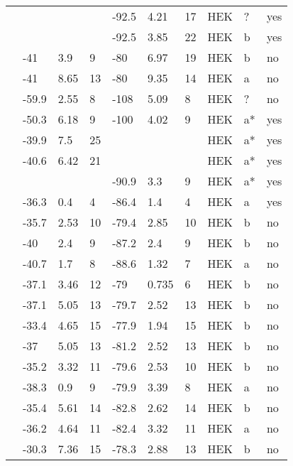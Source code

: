 \begin{footnotesize}
\begin{longtable}{p{5cm}|lll|lll|lll}
\citet{Hu2010MutationDB} & && & -92.5 & 4.21 & 17 & HEK & ? & yes \\
\citet{Hu2014MutationDB} & && & -92.5 & 3.85 & 22 & HEK & b & yes \\
\citet{Hu2015MutationDB} & -41 & 3.9 & 9 & -80 & 6.97 & 19 & HEK & b & no \\
\citet{Hu2015MutationDB} & -41 & 8.65 & 13 & -80 & 9.35 & 14 & HEK & a & no \\
\citet{Huang2006MutationDB} & -59.9 & 2.55 & 8 & -108 & 5.09 & 8 & HEK & ? & no \\
\citet{Huang2009MutationDB} & -50.3 & 6.18 & 9 & -100 & 4.02 & 9 & HEK & a* & yes \\
\citet{Itoh2005aMutationDB} & -39.9 & 7.5 & 25 & && & HEK & a* & yes \\
\citet{Itoh2005bMutationDB} & -40.6 & 6.42 & 21 & && & HEK & a* & yes \\
\citet{Itoh2007MutationDB} & && & -90.9 & 3.3 & 9 & HEK & a* & yes \\
\citet{Juang2014aMutationDB} & -36.3 & 0.4 & 4 & -86.4 & 1.4 & 4 & HEK & a & yes \\
\citet{Kapplinger2015MutationDB} & -35.7 & 2.53 & 10 & -79.4 & 2.85 & 10 & HEK & b & no \\
\citet{Kapplinger2015MutationDB} & -40 & 2.4 & 9 & -87.2 & 2.4 & 9 & HEK & b & no \\
\citet{Kapplinger2015MutationDB} & -40.7 & 1.7 & 8 & -88.6 & 1.32 & 7 & HEK & a & no \\
\citet{Kapplinger2015MutationDB} & -37.1 & 3.46 & 12 & -79 & 0.735 & 6 & HEK & b & no \\
\citet{Kapplinger2015MutationDB} & -37.1 & 5.05 & 13 & -79.7 & 2.52 & 13 & HEK & b & no \\
\citet{Kapplinger2015MutationDB} & -33.4 & 4.65 & 15 & -77.9 & 1.94 & 15 & HEK & b & no \\
\citet{Kapplinger2015MutationDB} & -37 & 5.05 & 13 & -81.2 & 2.52 & 13 & HEK & b & no \\
\citet{Kapplinger2015MutationDB} & -35.2 & 3.32 & 11 & -79.6 & 2.53 & 10 & HEK & b & no \\
\citet{Kapplinger2015MutationDB} & -38.3 & 0.9 & 9 & -79.9 & 3.39 & 8 & HEK & a & no \\
\citet{Kapplinger2015MutationDB} & -35.4 & 5.61 & 14 & -82.8 & 2.62 & 14 & HEK & b & no \\
\citet{Kapplinger2015MutationDB} & -36.2 & 4.64 & 11 & -82.4 & 3.32 & 11 & HEK & a & no \\
\citet{Kapplinger2015MutationDB} & -30.3 & 7.36 & 15 & -78.3 & 2.88 & 13 & HEK & b & no \\

\end{longtable}
\end{footnotesize}
